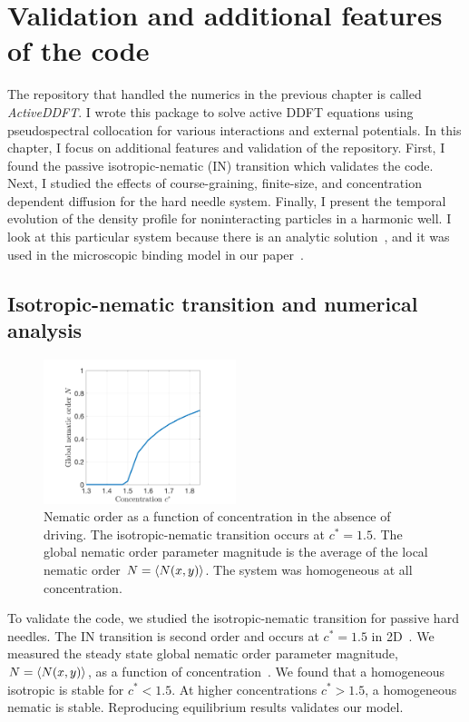 \chapter{Validation and additional features of the code}\label{ch07_validation}

The repository that handled the numerics in the previous chapter is called
\textit{ActiveDDFT}. I wrote this package to solve active DDFT
equations using pseudospectral collocation for various interactions and external
potentials.  In this chapter, I focus on additional features and validation of
the repository. First, I found the passive isotropic-nematic
(IN) transition which validates the code. Next, I studied the effects of
course-graining, finite-size, and concentration dependent diffusion for the hard
needle system. Finally, I present the temporal evolution of the density profile
for noninteracting particles in a harmonic well. I look at this particular
system because there is an analytic solution~\cite{doi_theory_88}, and it was
used in the microscopic binding model in our paper~\cite{maguire_design_18}. 

\section{Isotropic-nematic transition and numerical analysis}
\begin{figure}[!ht]
	\centering
  \includegraphics[width=0.50\textwidth]{figs/ch05_valid/in_trans.png}
  \caption[IN transition]
  {Nematic order as a function of concentration in the absence of driving.  The
    isotropic-nematic transition occurs at $c^* = 1.5$. The global nematic order
    parameter magnitude is the average of the local nematic order
    $N=\left\langle N(x,y) \right\rangle$. The system was homogeneous at all
    concentration.}\label{fig:in_trans}
\end{figure}

To validate the code, we studied the isotropic-nematic transition for passive
hard needles. The IN transition is second order and occurs at $c^*=1.5$ in
2D~\cite{kayser_bifurcation_78}. We measured the steady state global nematic
order parameter magnitude, $N = \left\langle N(x,y) \right\rangle$, as a function of
concentration~.  We found that a homogeneous isotropic is
stable for $c^*<1.5$.  At higher concentrations $c^*>1.5$, a homogeneous nematic
is stable. Reproducing equilibrium results validates our model.

